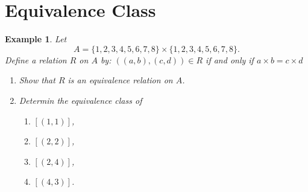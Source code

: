 \documentclass{../../cls/sig-alternate-05-2015}
\newtheorem{example}{Example}
\begin{document}
\section{Equivalence Class}
\begin{example}
    Let \begin{equation}
        A = \{1, 2, 3, 4, 5, 6, 7, 8\} \times \{1, 2, 3, 4, 5, 6, 7, 8\}.
    \end{equation} Define a relation $R$ on $A$ by: $((a, b), (c, d)) \in R$ if and only if $a \times b = c \times d$ \begin{enumerate}[label=(\alph*)]
		\item Show that $R$ is an equivalence relation on $A$.
		\item Determin the equivalence class of \begin{enumerate}[label=(\roman*)]
			\item $[(1, 1)]$,
			\item $[(2, 2)]$,
			\item $[(2, 4)]$,
			\item $[(4, 3)]$.
		\end{enumerate}
	\end{enumerate}
\end{example}
\end{document}
